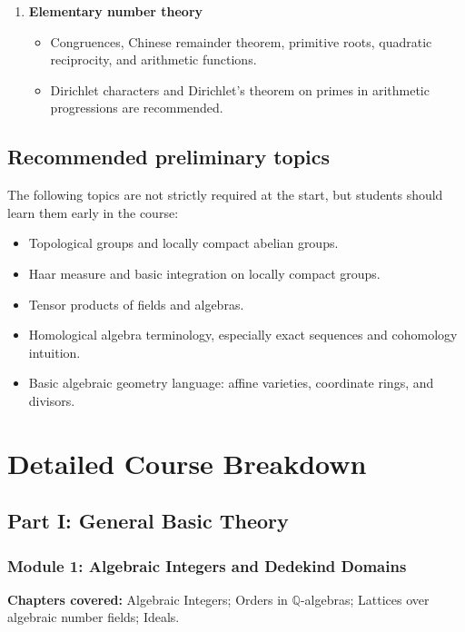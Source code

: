 \documentclass[11pt]{article}
\newcommand{\Q}{\mathbb{Q}}
\begin{document}
\begin{enumerate}
    \item \textbf{Elementary number theory}
    \begin{itemize}
        \item Congruences, Chinese remainder theorem, primitive roots, quadratic reciprocity, and arithmetic functions.
        \item Dirichlet characters and Dirichlet's theorem on primes in arithmetic progressions are recommended.
    \end{itemize}
\end{enumerate}

\subsection*{Recommended preliminary topics}
The following topics are not strictly required at the start, but students should learn them early in the course:
\begin{itemize}
    \item Topological groups and locally compact abelian groups.
    \item Haar measure and basic integration on locally compact groups.
    \item Tensor products of fields and algebras.
    \item Homological algebra terminology, especially exact sequences and cohomology intuition.
    \item Basic algebraic geometry language: affine varieties, coordinate rings, and divisors.
\end{itemize}

\section{Detailed Course Breakdown}

\subsection*{Part I: General Basic Theory}

\subsubsection*{Module 1: Algebraic Integers and Dedekind Domains}

\textbf{Chapters covered:} Algebraic Integers; Orders in $\Q$-algebras; Lattices over algebraic number fields; Ideals.
\end{document}
